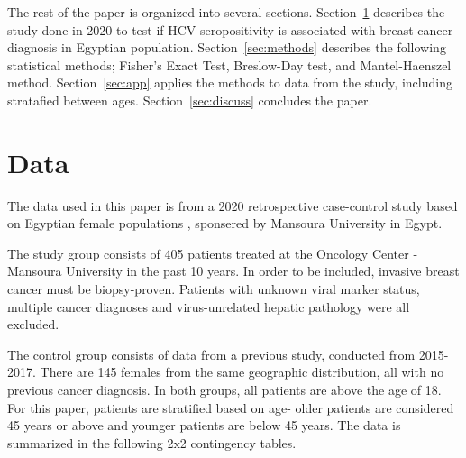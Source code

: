 \documentclass[12pt, titlepage]{article}
\begin{document}
The rest of the paper is organized into several sections. Section~\ref{sec:data}
describes the study done in 2020 to test if HCV seropositivity is associated with 
breast cancer diagnosis in Egyptian population. Section~\ref{sec:methods} 
describes the following statistical methods; Fisher's Exact Test, Breslow-Day test,
and Mantel-Haenszel method. Section~\ref{sec:app} applies the methods to data 
from the study, including stratafied between ages. Section~\ref{sec:discuss} 
concludes the paper.



\section{Data}
\label{sec:data}

The data used in this paper is from a 2020 retrospective case-control 
study based on Egyptian female populations \citep{2020association},
sponsered by Mansoura University in Egypt.

The study group consists of 405 patients treated at the Oncology Center 
- Mansoura University in the past 10 years. In order to be included, 
invasive breast cancer must be biopsy-proven. Patients with unknown 
viral marker status, multiple cancer diagnoses and virus-unrelated 
hepatic pathology were all excluded. 

The control group consists of 
data from a previous study, conducted from 2015-2017. There are 145 
females from the same geographic distribution, all with no previous 
cancer diagnosis. In both groups, all patients are above the age of 
18. For this paper, patients are stratified based on age- older patients 
are considered 45 years or above and younger patients are below 45 years. 
The data is summarized in the following 2x2 contingency tables. 

\vspace{1cm}
\end{document}
